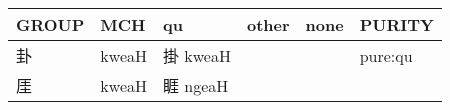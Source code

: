 \documentclass[14pt,a4paper]{scrartcl}
\begin{document}
\begin{longtable}[c]{@{}llllll@{}}
\toprule
\begin{minipage}[b]{0.14\columnwidth}\raggedright\strut
GROUP
\strut\end{minipage} &
\begin{minipage}[b]{0.14\columnwidth}\raggedright\strut
MCH
\strut\end{minipage} &
\begin{minipage}[b]{0.14\columnwidth}\raggedright\strut
qu
\strut\end{minipage} &
\begin{minipage}[b]{0.14\columnwidth}\raggedright\strut
other
\strut\end{minipage} &
\begin{minipage}[b]{0.14\columnwidth}\raggedright\strut
none
\strut\end{minipage} &
\begin{minipage}[b]{0.14\columnwidth}\raggedright\strut
PURITY
\strut\end{minipage}\tabularnewline
\midrule
\endhead
\begin{minipage}[t]{0.14\columnwidth}\raggedright\strut
卦
\strut\end{minipage} &
\begin{minipage}[t]{0.14\columnwidth}\raggedright\strut
kweaH
\strut\end{minipage} &
\begin{minipage}[t]{0.14\columnwidth}\raggedright\strut
掛 kweaH
\strut\end{minipage} &
\begin{minipage}[t]{0.14\columnwidth}\raggedright\strut
\strut\end{minipage} &
\begin{minipage}[t]{0.14\columnwidth}\raggedright\strut
\strut\end{minipage} &
\begin{minipage}[t]{0.14\columnwidth}\raggedright\strut
pure:qu
\strut\end{minipage}\tabularnewline
\begin{minipage}[t]{0.14\columnwidth}\raggedright\strut
厓
\strut\end{minipage} &
\begin{minipage}[t]{0.14\columnwidth}\raggedright\strut
kweaH
\strut\end{minipage} &
\begin{minipage}[t]{0.14\columnwidth}\raggedright\strut
睚 ngeaH
\strut\end{minipage} &
\begin{minipage}[t]{0.14\columnwidth}\raggedright\strut

\end{minipage}
\end{longtable}
\end{document}
